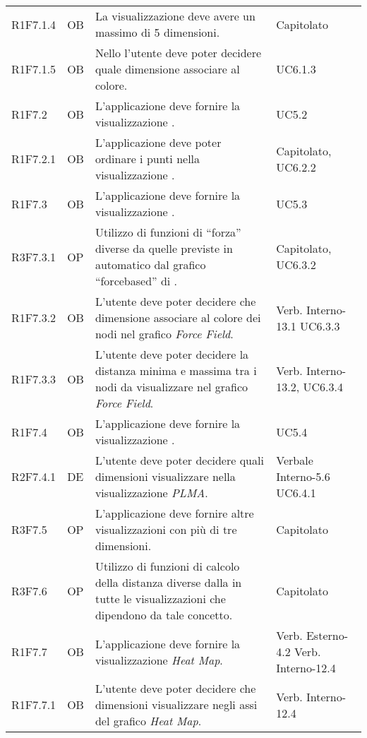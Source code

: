 {\begin{longtable}{C{2cm} | C{1.5cm} | C{9cm} | C{3.3cm}}
R1F7.1.4 & OB & La visualizzazione  deve avere un massimo di 5 dimensioni. & Capitolato\\

R1F7.1.5 & OB & Nello  l'utente deve poter decidere quale dimensione associare al colore. & UC6.1.3\\

R1F7.2 & OB & L'applicazione deve fornire la visualizzazione . & UC5.2\\
R1F7.2.1 & OB & L'applicazione deve poter ordinare i punti nella visualizzazione . & Capitolato, UC6.2.2 \\
R1F7.3 & OB & L'applicazione deve fornire la visualizzazione . & UC5.3\\
R3F7.3.1 & OP & Utilizzo di funzioni di “forza” diverse da quelle previste in automatico dal grafico “forcebased” di . & Capitolato, UC6.3.2\\
R1F7.3.2 & OB & L'utente deve poter decidere che dimensione associare al colore dei nodi nel grafico \textit{Force Field}. & Verb. Interno-13.1 \newline UC6.3.3\\
R1F7.3.3 & OB & L'utente deve poter decidere la distanza minima e massima tra i nodi da visualizzare nel grafico \textit{Force Field}. & Verb. Interno-13.2, UC6.3.4\\
R1F7.4 & OB & L'applicazione deve fornire la visualizzazione . & UC5.4 \\
R2F7.4.1 & DE & L'utente deve poter decidere quali dimensioni visualizzare nella visualizzazione \textit{PLMA}. & Verbale Interno-5.6 \newline UC6.4.1\\
R3F7.5 & OP & L'applicazione deve fornire altre visualizzazioni con più di tre dimensioni. & Capitolato\\
R3F7.6 & OP & Utilizzo di funzioni di calcolo della distanza diverse dalla  in tutte le visualizzazioni che dipendono da tale concetto. & Capitolato \\
R1F7.7 & OB & L'applicazione deve fornire la visualizzazione \newline \textit{Heat Map}. & Verb. Esterno-4.2 \newline Verb. Interno-12.4\\
R1F7.7.1 & OB & L'utente deve poter decidere che dimensioni visualizzare negli assi del grafico \textit{Heat Map}. & Verb. Interno-12.4\\

\end{longtable}}
